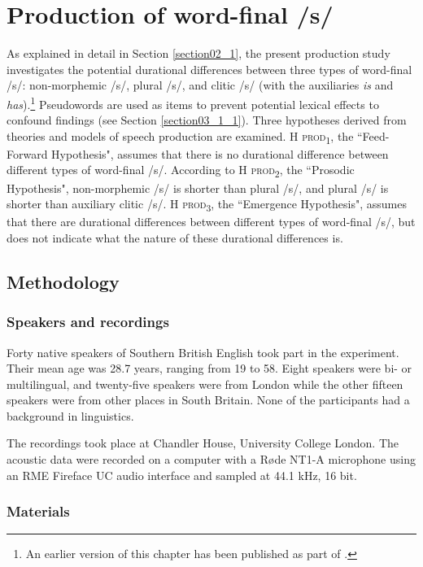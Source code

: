 \chapter{Production of word-final /s/}\label{chapter04}

As explained in detail in Section \ref{section02_1}, the present production study investigates the potential durational differences between three types of word-final /s/: non-morphemic /s/, plural /s/, and clitic /s/ (with the auxiliaries \textit{is} and \textit{has}).\footnote{An earlier version of this chapter has been published as part of \citet{Schmitz2021a}.} Pseudowords are used as items to prevent potential lexical effects to confound findings (see Section \ref{section03_1_1}). Three hypotheses derived from theories and models of speech production are examined. \textsc{H prod\textsubscript{1}}, the ``Feed-Forward Hypothesis", assumes that there is no durational difference between different types of word-final /s/. According to \textsc{H prod\textsubscript{2}}, the ``Prosodic Hypothesis", non-morphemic /s/ is shorter than plural /s/, and plural /s/ is shorter than auxiliary clitic /s/. \textsc{H prod\textsubscript{3}}, the ``Emergence Hypothesis", assumes that there are durational differences between different types of word-final /s/, but does not indicate what the nature of these durational differences is.

\section{Methodology}\label{section04_1}

\subsection{Speakers and recordings}\label{section04_1_1}

Forty native speakers of Southern British English took part in the experiment. Their mean age was 28.7 years, ranging from 19 to 58. Eight speakers were bi- or multilingual, and twenty-five speakers were from London while the other fifteen speakers were from other places in South Britain. None of the participants had a background in linguistics.

The recordings took place at Chandler House, University College London. The acoustic data were recorded on a computer with a Røde NT1-A microphone using an RME Fireface UC audio interface and sampled at 44.1 kHz, 16 bit.

\subsection{Materials}\label{section04_1_2}

